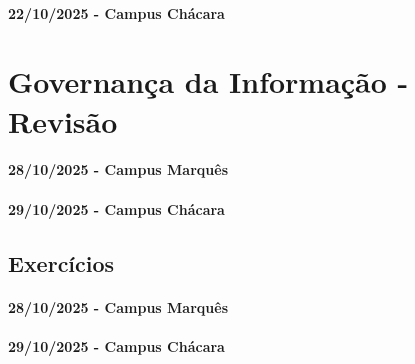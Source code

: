 \documentclass[
]{book}
\begin{document}
\subsubsection*{22/10/2025 - Campus Chácara}\label{campus-chuxe1cara-15}

\chapter{Governança da Informação - Revisão}\label{governanuxe7a-da-informauxe7uxe3o---revisuxe3o}

\subsubsection*{28/10/2025 - Campus Marquês}\label{campus-marquuxeas-16}

\subsubsection*{29/10/2025 - Campus Chácara}\label{campus-chuxe1cara-16}

\section{Exercícios}\label{exercuxedcios-10}

\subsubsection*{28/10/2025 - Campus Marquês}\label{campus-marquuxeas-17}

\subsubsection*{29/10/2025 - Campus Chácara}\label{campus-chuxe1cara-17}

  
\end{document}
